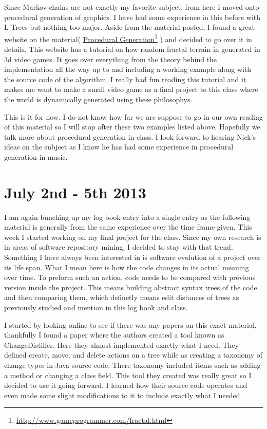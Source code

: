 \documentclass[conference]{IEEEtran}
\newcommand\fnurl[2]{%
  \href{#2}{#1}\footnote{\url{#2}}%
}
\begin{document}
Since Markov chains are not exactly my favorite subject, from here I moved onto procedural generation of graphics.
I have had some experience in this before with L-Trees but nothing too major. Aside from the material posted, I found
a great website on the material(\fnurl{Procedural Generation}{http://www.gameprogrammer.com/fractal.html}) and decided
to go over it in details. This website has a tutorial on how random fractal terrain in generated in 3d video games.
It goes over everything from the theory behind the implementation all the way up to and including a working example
along with the source code of the algorithm. I really had fun reading this tutorial and it makes me want to make
a small video game as a final project to this class where the world is dynamically generated using these philosophys.

This is it for now. I do not know how far we are suppose to go in our own reading of this material so I will stop
after these two examples listed above. Hopefully we talk more about procedural generation in class. I look forward
to hearing Nick's ideas on the subject as I know he has had some experience in procedural generation in music.

\section{July 2nd - 5th 2013}
I am again bunching up my log book entry into a single entry as the following material is generally from the
same experience over the time frame given. This week I started working on my final project for the class. Since my
own research is in areas of software repository mining, I decided to stay with that trend. Something I have always
been interested in is software evolution of a project over its life span. What I mean here is how the code changes
in its actual meaning over time. To preform such an action, code needs to be compared with previous version inside
the project. This means building abstract syntax trees of the code and then comparing them, which definetly means
edit distances of trees as previously studied and mention in this log book and class. 

I started by looking online to see if there was any papers on this exact material, thankfully I found a paper where
the authors created a tool known as ChangeDistiller. Here they almost implemented exactly what I need. They defined
create, move, and delete actions on a tree while as creating a taxonomy of change types in Java source code. There
taxonomy included items such as adding a method or changing a class field. This tool they created was really great
so I decided to use it going forward. I learned how their source code operates and even made some slight modifications
to it to include exactly what I needed. 
\end{document}
